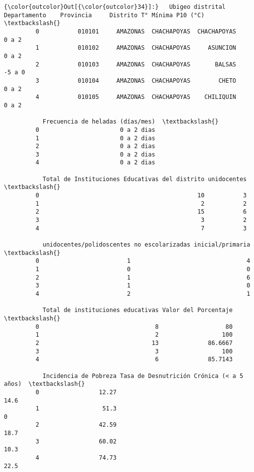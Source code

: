 \documentclass[11pt]{article}
\begin{document}
\begin{Verbatim}[commandchars=\\\{\}]
{\color{outcolor}Out[{\color{outcolor}34}]:}   Ubigeo distrital Departamento    Provincia     Distrito T° Mínima P10 (°C)  \textbackslash{}
         0           010101     AMAZONAS  CHACHAPOYAS  CHACHAPOYAS              0 a 2   
         1           010102     AMAZONAS  CHACHAPOYAS     ASUNCION              0 a 2   
         2           010103     AMAZONAS  CHACHAPOYAS       BALSAS             -5 a 0   
         3           010104     AMAZONAS  CHACHAPOYAS        CHETO              0 a 2   
         4           010105     AMAZONAS  CHACHAPOYAS    CHILIQUIN              0 a 2   
         
           Frecuencia de heladas (días/mes)  \textbackslash{}
         0                       0 a 2 dias   
         1                       0 a 2 dias   
         2                       0 a 2 dias   
         3                       0 a 2 dias   
         4                       0 a 2 dias   
         
           Total de Instituciones Educativas del distrito unidocentes  \textbackslash{}
         0                                             10           3   
         1                                              2           2   
         2                                             15           6   
         3                                              3           2   
         4                                              7           3   
         
           unidocentes/polidoscentes no escolarizadas inicial/primaria  \textbackslash{}
         0                         1                                 4   
         1                         0                                 0   
         2                         1                                 6   
         3                         1                                 0   
         4                         2                                 1   
         
           Total de instituciones educativas Valor del Porcentaje  \textbackslash{}
         0                                 8                   80   
         1                                 2                  100   
         2                                13              86.6667   
         3                                 3                  100   
         4                                 6              85.7143   
         
           Incidencia de Pobreza Tasa de Desnutrición Crónica (< a 5 años)  \textbackslash{}
         0                 12.27                                      14.6   
         1                  51.3                                         0   
         2                 42.59                                      18.7   
         3                 60.02                                      10.3   
         4                 74.73                                      22.5   
         

\end{Verbatim}
\end{document}
